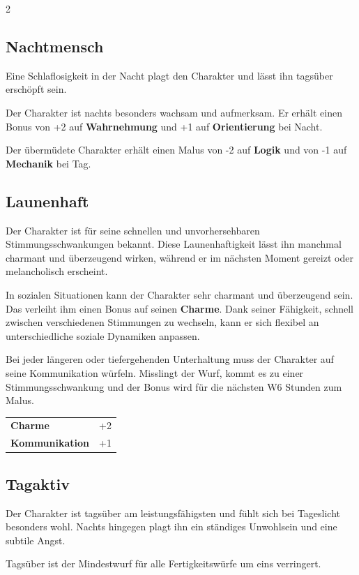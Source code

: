 \begin{multicols}{2}
    \subsection*{Nachtmensch}

    Eine Schlaflosigkeit in der Nacht plagt den Charakter und lässt ihn tagsüber erschöpft sein.

    Der Charakter ist nachts besonders wachsam und aufmerksam. Er erhält einen Bonus von +2 auf \textbf{Wahrnehmung} und +1 auf \textbf{Orientierung} bei Nacht.

    Der übermüdete Charakter erhält einen Malus von -2 auf \textbf{Logik} und von -1 auf \textbf{Mechanik} bei Tag.


    \subsection*{Launenhaft}

    Der Charakter ist für seine schnellen und unvorhersehbaren Stimmungsschwankungen bekannt. Diese Launenhaftigkeit lässt ihn manchmal charmant und überzeugend wirken, während er im nächsten Moment gereizt oder melancholisch erscheint.

    In sozialen Situationen kann der Charakter sehr charmant und überzeugend sein. Das verleiht ihm einen Bonus auf seinen \textbf{Charme}. Dank seiner Fähigkeit, schnell zwischen verschiedenen Stimmungen zu wechseln, kann er sich flexibel an unterschiedliche soziale Dynamiken anpassen.

    Bei jeder längeren oder tiefergehenden Unterhaltung muss der Charakter auf seine Kommunikation würfeln. Misslingt der Wurf, kommt es zu einer Stimmungsschwankung und der Bonus wird für die nächsten W6 Stunden zum Malus.

    \begin{tabular}{@{}ll@{}}
        \textbf{Charme} & +2\\
        \textbf{Kommunikation} & +1\\
    \end{tabular}

    \subsection*{Tagaktiv}

    Der Charakter ist tagsüber am leistungsfähigsten und fühlt sich bei Tageslicht besonders wohl. Nachts hingegen plagt ihn ein ständiges Unwohlsein und eine subtile Angst.

    Tagsüber ist der Mindestwurf für alle Fertigkeitswürfe um eins verringert.


\end{multicols}
